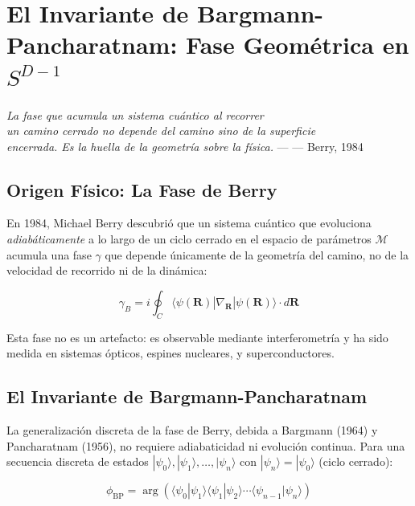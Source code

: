 \chapter{El Invariante de Bargmann-Pancharatnam: Fase Geométrica en $S^{D-1}$}


\textit{La fase que acumula un sistema cuántico al recorrer\\
un camino cerrado no depende del camino sino de la superficie\\
encerrada. Es la huella de la geometría sobre la física.} --- --- Berry, 1984

\section{Origen Físico: La Fase de Berry}

En 1984, Michael Berry descubrió que un sistema cuántico que evoluciona
\textit{adiabáticamente} a lo largo de un ciclo cerrado en el espacio de
parámetros $\mathcal{M}$ acumula una fase $\gamma$ que depende únicamente
de la geometría del camino, no de la velocidad de recorrido ni de la dinámica:

\begin{equation}
\gamma_B = i \oint_C \langle \psi(\mathbf{R}) | \nabla_{\mathbf{R}} | \psi(\mathbf{R}) \rangle \cdot d\mathbf{R}

\end{equation}

Esta fase no es un artefacto: es observable mediante interferometría y ha sido
medida en sistemas ópticos, espines nucleares, y superconductores.

\section{El Invariante de Bargmann-Pancharatnam}

La generalización discreta de la fase de Berry, debida a Bargmann (1964) y
Pancharatnam (1956), no requiere adiabaticidad ni evolución continua. Para una
secuencia discreta de estados $|\psi_0\rangle, |\psi_1\rangle, \ldots, |\psi_n\rangle$
con $|\psi_n\rangle = |\psi_0\rangle$ (ciclo cerrado):

\begin{equation}
\phi_{\text{BP}} = \arg\left(\langle\psi_0|\psi_1\rangle \langle\psi_1|\psi_2\rangle \cdots \langle\psi_{n-1}|\psi_n\rangle\right)

\end{equation}

